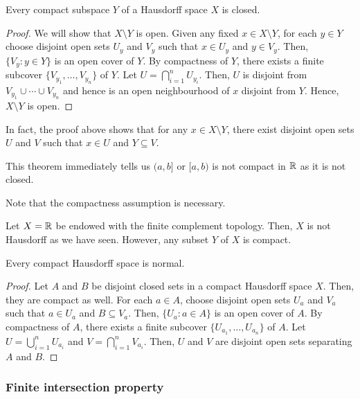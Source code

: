 \begin{theorem}
    Every compact subspace $Y$ of a Hausdorff space $X$ is closed.
\end{theorem}

\begin{proof}
    We will show that $X\setminus Y$ is open. Given any fixed $x\in X\setminus Y$, for each $y\in Y$ choose disjoint open sets $U_y$ and $V_y$ such that $x\in U_y$ and $y\in V_y$. Then, $\{V_y:y\in Y\}$ is an open cover of $Y$. By compactness of $Y$, there exists a finite subcover $\{V_{y_1},\ldots,V_{y_n}\}$ of $Y$. Let $U=\bigcap_{i=1}^n U_{y_i}$. Then, $U$ is disjoint from $V_{y_1}\cup\cdots\cup V_{y_n}$ and hence is an open neighbourhood of $x$ disjoint from $Y$. Hence, $X\setminus Y$ is open.
\end{proof}

In fact, the proof above shows that for any $x\in X\setminus Y$, there exist disjoint open sets $U$ and $V$ such that $x\in U$ and $Y\subseteq V$.


\begin{example}
    This theorem immediately tells us $(a,b]$ or $[a,b)$ is not compact in $\mathbb{R}$ as it is not closed.
\end{example}

Note that the compactness assumption is necessary. 

\begin{example}
    Let $X=\mathbb{R}$ be endowed with the finite complement topology. Then, $X$ is not Hausdorff as we have seen. However, any subset $Y$ of $X$ is compact. 
\end{example}

\begin{theorem}
    Every compact Hausdorff space is normal.
\end{theorem}

\begin{proof}
    Let $A$ and $B$ be disjoint closed sets in a compact Hausdorff space $X$. Then, they are compact as well. For each $a\in A$, choose disjoint open sets $U_a$ and $V_a$ such that $a\in U_a$ and $B\subseteq V_a$. Then, $\{U_a:a\in A\}$ is an open cover of $A$. By compactness of $A$, there exists a finite subcover $\{U_{a_1},\ldots,U_{a_n}\}$ of $A$. Let $U=\bigcup_{i=1}^n U_{a_i}$ and $V=\bigcap_{i=1}^n V_{a_i}$. Then, $U$ and $V$ are disjoint open sets separating $A$ and $B$.
\end{proof}

\subsubsection*{Finite intersection property}

